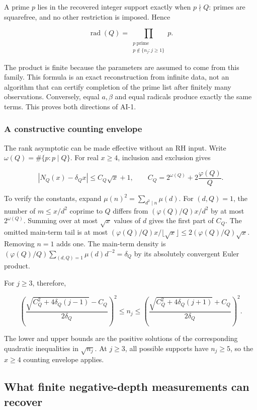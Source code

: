 A prime \(p\) lies in the recovered integer support exactly when
\(p\nmid Q\): primes are squarefree, and no other restriction is
imposed. Hence

\[
 \boxed{\displaystyle
 \operatorname{rad}(Q)=\prod_{\substack{p\ \mathrm{prime}\\
                                      p\notin\{n_j:j\ge1\}}}p.}
\]

The product is finite because the parameters are assumed to come from
this family. This formula is an exact reconstruction from infinite data,
not an algorithm that can certify completion of the prime list after
finitely many observations. Conversely, equal \(a,\beta\) and equal
radicals produce exactly the same terms. This proves both directions of
AI-1.

\hypertarget{a-constructive-counting-envelope}{%
\subsubsection{A constructive counting
envelope}\label{a-constructive-counting-envelope}}

The rank asymptotic can be made effective without an RH input. Write
\(\omega(Q)=\#\{p:p\mid Q\}\). For real \(x\ge4\), inclusion and
exclusion gives

\[
 |N_Q(x)-\delta_Qx|\le C_Q\sqrt x+1,
 \qquad C_Q=2^{\omega(Q)}+2\frac{\varphi(Q)}Q.
\]

To verify the constants, expand \(\mu(n)^2=\sum_{d^2\mid n}\mu(d)\). For
\((d,Q)=1\), the number of \(m\le x/d^2\) coprime to \(Q\) differs from
\((\varphi(Q)/Q)x/d^2\) by at most \(2^{\omega(Q)}\). Summing over at
most \(\sqrt x\) values of \(d\) gives the first part of \(C_Q\). The
omitted main-term tail is at most
\((\varphi(Q)/Q)x/\lfloor\sqrt x\rfloor\le2(\varphi(Q)/Q)\sqrt x\).
Removing \(n=1\) adds one. The main-term density is
\((\varphi(Q)/Q)\sum_{(d,Q)=1}\mu(d)d^{-2}=\delta_Q\) by its absolutely
convergent Euler product.

For \(j\ge3\), therefore,

\[
 \left(\frac{\sqrt{C_Q^2+4\delta_Q(j-1)}-C_Q}{2\delta_Q}\right)^2
 \le n_j\le
 \left(\frac{\sqrt{C_Q^2+4\delta_Q(j+1)}+C_Q}{2\delta_Q}\right)^2.
\]

The lower and upper bounds are the positive solutions of the
corresponding quadratic inequalities in \(\sqrt{n_j}\). At \(j\ge3\),
all possible supports have \(n_j\ge5\), so the \(x\ge4\) counting
envelope applies.

\hypertarget{what-finite-negative-depth-measurements-can-recover}{%
\subsection{What finite negative-depth measurements can
recover}\label{what-finite-negative-depth-measurements-can-recover}}

